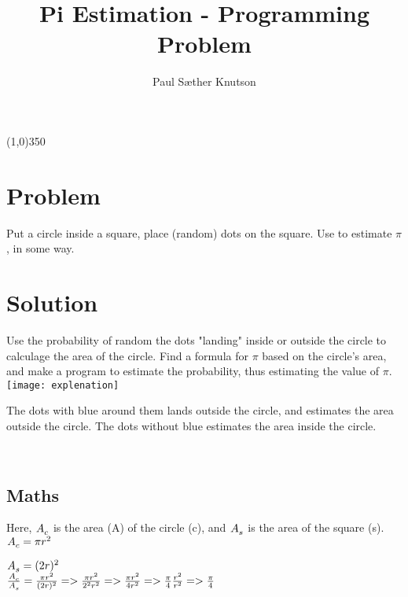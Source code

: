 \documentclass{article}
\begin{document}
\title {Pi Estimation - Programming Problem}
\author{Paul Sæther Knutson}
\maketitle

\begin{center}
\line(1,0){350}
\end{center}

\hfill

\section{Problem}
Put a circle inside a square, place (random) dots on the square.
Use to estimate $\pi$, in some way. \\

\section{Solution}
Use the probability of random the dots "landing" inside or outside the circle to calculage the area of the circle.
Find a formula for $\pi$ based on the circle's area, and make a program to estimate the probability, thus estimating the value of $\pi$. \\

\texttt{[image: explenation]}

The dots with blue around them lands outside the circle, and estimates the area outside the circle.
The dots without blue estimates the area inside the circle.

\hfill \\



\subsection{Maths}
Here,
$\prescript{}{}{A}^{}_{c}$
is the area (A) of the circle (c), and 
$\prescript{}{}{A}^{}_{s}$
is the area of the square (s). \\

$\prescript{}{}{A}^{}_{c} = \pi r^2$

$\prescript{}{}{A}^{}_{s} = (2r)^2$ \\

$\frac { \prescript{}{}{A}^{}_{c} }  { \prescript{}{}{A}^{}_{s} }
 = 
\frac
{ \pi r^2 }
{ (2r)^2 }
 =>
\frac { \pi r^2 }  { 2^2 r^2 }
 =>
\frac { \pi r^2 }  { 4 r^2 }
 =>
\frac { \pi }  { 4 }
\frac { r^2 }  { r^2 }
 =>
\frac { \pi }  { 4 }$
\end{document}
